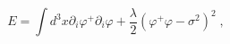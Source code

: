 \begin{equation}
E=\int d^{3}x\partial _{i}\varphi ^{+}\partial _{i}\varphi +\frac{\lambda }{2%
}\left( \varphi ^{+}\varphi -\sigma ^{2}\right) ^{2}\;,  \label{lg}
\end{equation}

